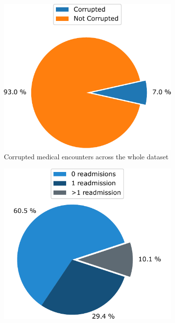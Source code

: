 \documentclass[a4paper,11pt]{article}
\begin{document}
\begin{figure}[H]
\centering
\begin{subfigure}{0.32\textwidth}
    \includegraphics[width=\textwidth]{images/week1_pie1.pdf}
    \caption{Corrupted medical encounters across the whole dataset}
    \label{fig:duplicated_patients_first}
\end{subfigure}
\hfill
\begin{subfigure}{0.32\textwidth}
    \includegraphics[width=\textwidth]{images/week1_pie2.pdf}

\end{subfigure}
\end{figure}
\end{document}
